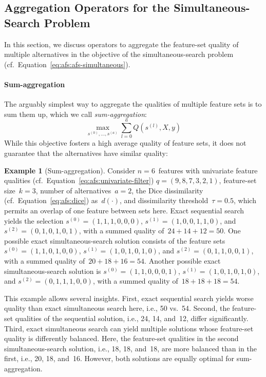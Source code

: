 \documentclass{article}
\theoremstyle{definition}
\newtheorem{example}{Example}
\begin{document}
\subsection{Aggregation Operators for the Simultaneous-Search Problem}
\label{sec:afs:appendix:simultaneous-objective-aggregation}

In this section, we discuss operators to aggregate the feature-set quality of multiple alternatives in the objective of the simultaneous-search problem (cf.~Equation~\ref{eq:afs:afs-simultaneous}).

\paragraph{Sum-aggregation}

The arguably simplest way to aggregate the qualities of multiple feature sets is to sum them up, which we call \emph{sum-aggregation}:
%
\begin{equation}
	\max_{s^{(0)}, \dots, s^{(a)}} \sum_{l=0}^a Q(s^{(l)},X,y)
	\label{eq:afs:afs-simultaneous-sum-objective}
\end{equation}
%
While this objective fosters a high average quality of feature sets, it does not guarantee that the alternatives have similar quality:
%
\begin{example}[Sum-aggregation]
Consider $n=6$~features with univariate feature qualities (cf.~Equation~\ref{eq:afs:univariate-filter}) $q = (9,8,7,3,2,1)$, feature-set size~$k=3$, number of alternatives~$a=2$, the Dice dissimilarity (cf.~Equation~\ref{eq:afs:dice}) as~$d(\cdot)$, and dissimilarity threshold~$\tau = 0.5$, which permits an overlap of one feature between sets here.
Exact sequential search yields the selection $s^{(0)} = (1,1,1,0,0,0)$, $s^{(1)} = (1,0,0,1,1,0)$, and $s^{(2)} = (0,1,0,1,0,1)$, with a summed quality of $\,24+14+12=50$.
One possible exact simultaneous-search solution consists of the feature sets $s^{(0)} = (1,1,0,1,0,0)$, $s^{(1)} = (1,0,1,0,1,0)$, and $s^{(2)} = (0,1,1,0,0,1)$, with a summed quality of $\,20+18+16=54$.
Another possible exact simultaneous-search solution is $s^{(0)} = (1,1,0,0,0,1)$, $s^{(1)} = (1,0,1,0,1,0)$, and $s^{(2)} = (0,1,1,1,0,0)$, with a summed quality of $\,18+18+18=54$.
\label{ex:afs:sum-aggregation}
\end{example}
%
This example allows several insights.
First, exact sequential search yields worse quality than exact simultaneous search here, i.e., 50 vs.~54.
Second, the feature-set qualities of the sequential solution, i.e., 24, 14, and~12, differ significantly.
Third, exact simultaneous search can yield multiple solutions whose feature-set quality is differently balanced.
Here, the feature-set qualities in the second simultaneous-search solution, i.e., 18, 18, and~18, are more balanced than in the first, i.e., 20, 18, and~16.
However, both solutions are equally optimal for sum-aggregation.
\end{document}

